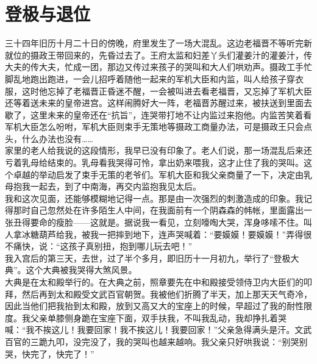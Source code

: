 \fancyhead[RO]{} %
\fancyhead[LE]{} %
\chapter*{登极与退位}
\thispagestyle{empty}
三十四年旧历十月二十日的傍晚，府里发生了一场大混乱。这边老福晋不等听完新就位的摄政王带回来的，先昏过去了。王府太监和妇差丫头们灌姜汁的灌姜汁，传大夫的传大夫，忙成一团，那边又传过来孩子的哭叫和大人们哄劝声。摄政工手忙脚乱地跑出跑进，一会儿招呼着随他一起来的军机大臣和内监，叫人给孩子穿衣服，这时他忘掉了老福晋正昏迷不醒，一会被叫进去看老福晋，又忘掉了军机大臣还等着送未来的皇帝进宫。这样闹腾好大一阵，老福晋苏醒过来，被扶送到里面去歇了，这里未来的皇帝还在“抗旨”，连哭带打地不让内监过来抱他。内监苦笑着看军机大臣怎么吩咐，军机大臣则束手无策地等摄政工商量办法，可是摄政王只会点头，什么办法也没有……\\

家里的老人给我说的这段情形，我早已没有印象了。老人们说，那一场混乱后来还亏着乳母给结束的。乳母看我哭得可怜，拿出奶来喂我，这才止住了我的哭叫。这个卓越的举动启发了束手无策的老爷们。军机大臣和我父亲商量了一下，决定由乳母抱我一起去，到了中南海，再交内监抱我见太后。\\

我和这次见面，还能够模糊地记得一点。那是由一次强烈的刺激造成的印象。我记得那时自己忽然处在许多陌生人中间，在我面前有一个阴森森的帏帐，里面露出一张丑得要命的瘦脸——这就是。据说我一看见，立刻嚎啕大哭，浑身哆嗦不住。叫人拿冰糖葫芦给我，被我一把摔到地下，连声哭喊着：“要嫫嫫！要嫫嫫！”弄得很不痛快，说：“这孩子真别扭，抱到哪儿玩去吧！”\\

我入宫后的第三天，去世，过了半个多月，即旧历十一月初九，举行了“登极大典”。这个大典被我哭得大煞风景。\\

大典是在太和殿举行的。在大典之前，照章要先在中和殿接受领侍卫内大臣们的叩拜，然后再到太和殿受文武百官朝贺。我被他们折腾了半天，加上那天天气奇冷，因此当他们把我抬到太和殿，放到又高又大的宝座上的时候，早超过了我的耐性限度。我父亲单膝侧身跪在宝座下面，双手扶我，不叫我乱动，我却挣扎着哭喊：“我不挨这儿！我要回家！我不挨这儿！我要回家！”父亲急得满头是汗。文武百官的三跪九叩，没完没了，我的哭叫也越来越响。我父亲只好哄我说：“别哭别哭，快完了，快完了！”\\

